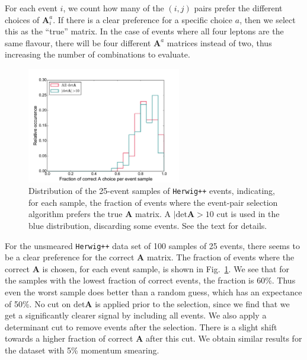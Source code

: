 \documentclass[twoside,english]{uiofysmaster}
\begin{document}
For each event $i$, we count how many of the $(i,j)$ pairs prefer the different choices of $\mathbf{A}_i^a$. If there is a clear preference for a specific choice $a$, then we select this as the ``true'' matrix. In the case of events where all four leptons are the same flavour, there will be four different $\mathbf{A}^a$ matrices instead of two, thus increasing the number of combinations to evaluate.
\begin{figure}[hbtp!]
	\centering
		\includegraphics[width=0.6\textwidth]{figures/improving_combinatorics/histogram-pairwise_A_selection-fraction_of_corr_A.pdf} 
	\caption{Distribution of the 25-event samples of {\tt Herwig++} events, indicating, for each sample, the fraction of events where the event-pair selection algorithm prefers the true $\mathbf{A}$ matrix. A $|\mathrm{det}\mathbf A > 10$ cut is used in the blue distribution, discarding some events. See the text for details.}
	\label{fig:correct_A_preference_distribution}
\end{figure}

For the unsmeared {\tt Herwig++} data set of 100 samples of 25 events, there seems to be a clear preference for the correct $\mathbf A$ matrix. The fraction of events where the correct $\mathbf A$ is chosen, for each event sample, is shown in Fig.\ \ref{fig:correct_A_preference_distribution}. We see that for the samples with the lowest fraction of correct events, the fraction is 60\%. Thus even the worst sample does better than a random guess, which has an expectance of 50\%. No cut on $\mathrm{det}\mathbf{A}$ is applied prior to the selection, since we find that we get a significantly clearer signal by including all events. We also apply a determinant cut to remove events after the selection. There is a slight shift towards a higher fraction of correct $\mathbf{A}$ after this cut. We obtain similar results for the dataset with 5\% momentum smearing.
\end{document}
